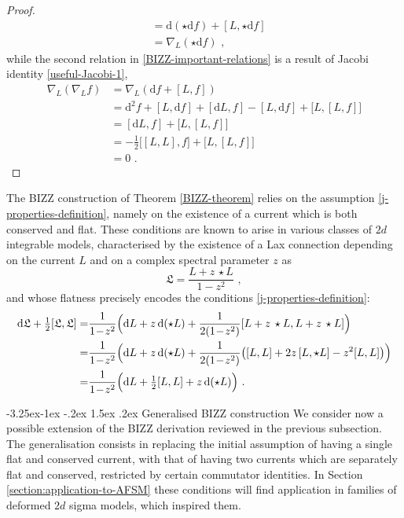 \documentclass[12pt]{article}
\makeatletter
\renewcommand\subsection{\@startsection{subsection}{2}{\z@}%
                                     {-3.25ex\@plus -1ex \@minus -.2ex}%
                                     {1.5ex \@plus .2ex}%
                                     {\normalfont\bfseries}}
\numberwithin{equation}{section}
\makeatother
\begin{document}
\begin{proof}
\begin{equation}
\begin{aligned}
&=\mathrm{d}(\star \mathrm{d}f)+[L,\star \mathrm{d}f]
\\
&=\nabla_{L}(\star \mathrm{d}f) \,\, ,
\end{aligned}
\end{equation}
while the second relation in \eqref{BIZZ-important-relations} is a result of Jacobi identity \eqref{useful-Jacobi-1},
\begin{equation}
\begin{aligned}
\nabla_{L}(\nabla_{L}f)&=\nabla_{L}(\mathrm{d}f+[L,f])
\\
&=\mathrm{d}^2f+[L,\mathrm{d}f]+[\mathrm{d}L,f]-[L,\mathrm{d}f]+\bigl[L,[L,f]\bigr]
\\
&=[\mathrm{d}L,f]+\bigl[L,[L,f]\bigr]
\\
&=-\tfrac{1}{2}\bigl[[L,L],f\bigr]+\bigl[L,[L,f]\bigr]
\\
&=0 \,\, .
\end{aligned}
\end{equation}\qedhere
\end{proof}
The BIZZ construction of Theorem \ref{BIZZ-theorem} relies on the assumption \eqref{j-properties-definition}, namely on the existence of a current which is both conserved and flat. These conditions are known to arise in various classes of $2d$ integrable models, characterised by the existence of a Lax connection depending on the current $L$ and on a complex spectral parameter $z$ as
\begin{equation}\label{BIZZ-Lax}
\mathfrak{L}=\frac{L+z \,\star L}{1-z^2} \,\, ,
\end{equation}
and whose flatness precisely encodes the conditions \eqref{j-properties-definition}:
\begin{equation}\label{BIZZ-Lax-flatness}
\begin{aligned}
\mathrm{d}\mathfrak{L}+\tfrac{1}{2}[\mathfrak{L},\mathfrak{L}]=&\frac{1}{1\!-\!z^2}\Bigl( \mathrm{d}L+z\,\mathrm{d}(\star L)+\frac{1}{2(1\!-\!z^2)} [L+z\,\star L,L+z\,\star L]  \Bigr)
\\
=&\frac{1}{1\!-\!z^2}\Bigl( \mathrm{d}L+z\,\mathrm{d}(\star L)+\frac{1}{2(1\!-\!z^2)} \bigl( [L,L]+2z\,[L,\star L]-z^2[L,L]  \bigr)\Bigr)
\\
=&\frac{1}{1\!-\!z^2}\Bigl( \mathrm{d}L+\tfrac{1}{2}[L,L]  +z\,\mathrm{d}(\star L)\Bigr) \,\, .
\end{aligned}
\end{equation}



\subsection{Generalised BIZZ construction}\label{subsec:generalised-BIZZ}
We consider now a possible extension of the BIZZ derivation reviewed in the previous subsection. The generalisation consists in replacing the initial assumption of having a single flat and conserved current, with that of having two currents which are separately flat and conserved, restricted by certain commutator identities. In Section \ref{section:application-to-AFSM} these conditions will find application in families of deformed $2d$ sigma models, which inspired them.
\end{document}
